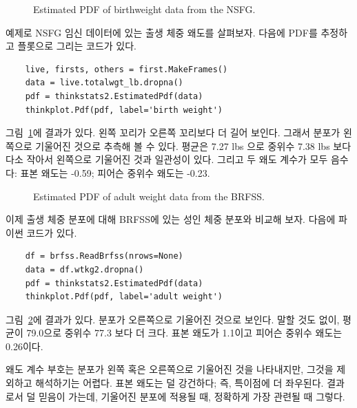 
\begin{figure}
\caption{Estimated PDF of birthweight data from the NSFG.}
\label{density_totalwgt_kde}
\end{figure}

예제로 NSFG 임신 데이터에 있는 출생 체중 왜도를 살펴보자.
다음에 PDF를 추정하고 플롯으로 그리는 코드가 있다.

\begin{verbatim}
    live, firsts, others = first.MakeFrames()
    data = live.totalwgt_lb.dropna()
    pdf = thinkstats2.EstimatedPdf(data)
    thinkplot.Pdf(pdf, label='birth weight')
\end{verbatim}

그림~\ref{density_totalwgt_kde}에 결과가 있다.
왼쪽 꼬리가 오른쪽 꼬리보다 더 길어 보인다. 
그래서 분포가 왼쪽으로 기울어진 것으로 추측해 볼 수 있다.
평균은 7.27 lbs 으로 중위수 7.38 lbs 보다 다소 작아서 왼쪽으로 기울어진 것과
일관성이 있다. 그리고 두 왜도 계수가 모두 음수다: 표본 왜도는  -0.59; 피어슨 중위수 왜도는 -0.23.

\begin{figure}
\caption{Estimated PDF of adult weight data from the BRFSS.}
\label{density_wtkg2_kde}
\end{figure}

이제 출생 체중 분포에 대해 BRFSS에 있는 성인 체중 분포와 비교해 보자.
다음에 파이썬 코드가 있다.

\begin{verbatim}
    df = brfss.ReadBrfss(nrows=None)
    data = df.wtkg2.dropna()
    pdf = thinkstats2.EstimatedPdf(data)
    thinkplot.Pdf(pdf, label='adult weight')
\end{verbatim}

그림~\ref{density_wtkg2_kde}에 결과가 있다.
분포가 오른쪽으로 기울어진 것으로 보인다.
말할 것도 없이, 평균이 79.0으로 중위수 77.3 보다 더 크다.
표본 왜도가 1.1이고 피어슨 중위수 왜도는 0.26이다.

왜도 계수 부호는 분포가 왼쪽 혹은 오른쪽으로 기울어진 것을 나타내지만,
그것을 제외하고 해석하기는 어렵다.
표본 왜도는 덜 강건하다; 즉, 특이점에 더 좌우된다.
결과로서 덜 믿음이 가는데, 기울어진 분포에 적용될 때, 정확하게 가장 관련될 때 그렇다. 

